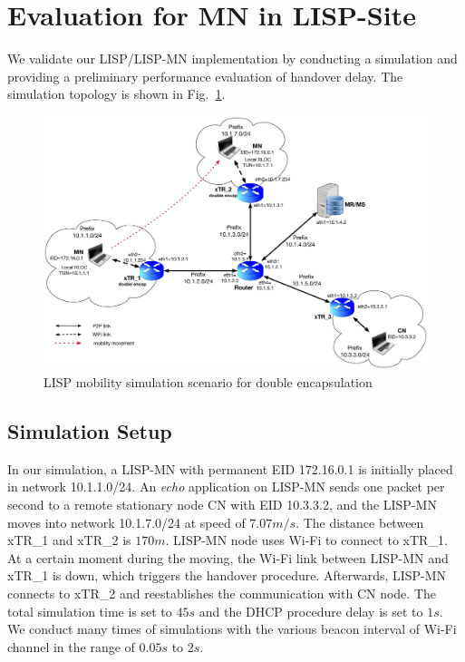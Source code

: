 \section{Evaluation for MN in LISP-Site}
\label{sec:ns3_evaluation_xTR}
We validate our LISP/LISP-MN implementation by conducting a simulation and providing a preliminary performance evaluation of handover delay. The simulation topology is shown in Fig.~\ref{sim_scenario}.
\begin{figure}[!th]
	\centering
	\includegraphics[width=\textwidth]{Pics/mobility_through_subnets_2_encap_topo}
	\caption{LISP mobility simulation scenario for double encapsulation}
	\label{sim_scenario}
\end{figure}

\subsection{Simulation Setup}
\label{subsec:ns3_setup_xTR}
In our simulation, a LISP-MN with permanent EID 172.16.0.1 is initially placed in network 10.1.1.0/24. An \emph{echo} application on LISP-MN sends one packet per second to a remote stationary node CN with EID 10.3.3.2, and the LISP-MN moves into network 10.1.7.0/24 at speed of $7.07m/s$. The distance between xTR\_1 and xTR\_2 is $170m$. LISP-MN node uses Wi-Fi to connect to xTR\_1. At a certain moment during the moving, the Wi-Fi link between LISP-MN and xTR\_1 is down, which triggers the handover procedure. Afterwards, LISP-MN connects to xTR\_2 and reestablishes the communication with CN node. The total simulation time is set to $45s$ and the DHCP procedure delay is set to $1s$. We conduct many times of simulations with the various beacon interval of Wi-Fi channel in the range of $0.05s$ to $2s$.

